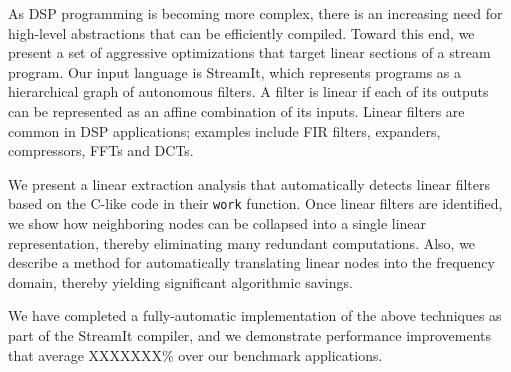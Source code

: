 As DSP programming is becoming more complex, there is an increasing
need for high-level abstractions that can be efficiently compiled.
Toward this end, we present a set of aggressive optimizations that
target linear sections of a stream program.  Our input language is
StreamIt, which represents programs as a hierarchical graph of
autonomous filters.  A filter is linear if each of its outputs can be
represented as an affine combination of its inputs.  Linear filters
are common in DSP applications; examples include FIR filters,
expanders, compressors, FFTs and DCTs.

We present a linear extraction analysis that automatically detects
linear filters based on the C-like code in their {\tt work} function.
Once linear filters are identified, we show how neighboring nodes can
be collapsed into a single linear representation, thereby eliminating
many redundant computations.  Also, we describe a method for
automatically translating linear nodes into the frequency domain,
thereby yielding significant algorithmic savings.

We have completed a fully-automatic implementation of the above
techniques as part of the StreamIt compiler, and we demonstrate
performance improvements that average XXXXXXX\% over our benchmark
applications.



